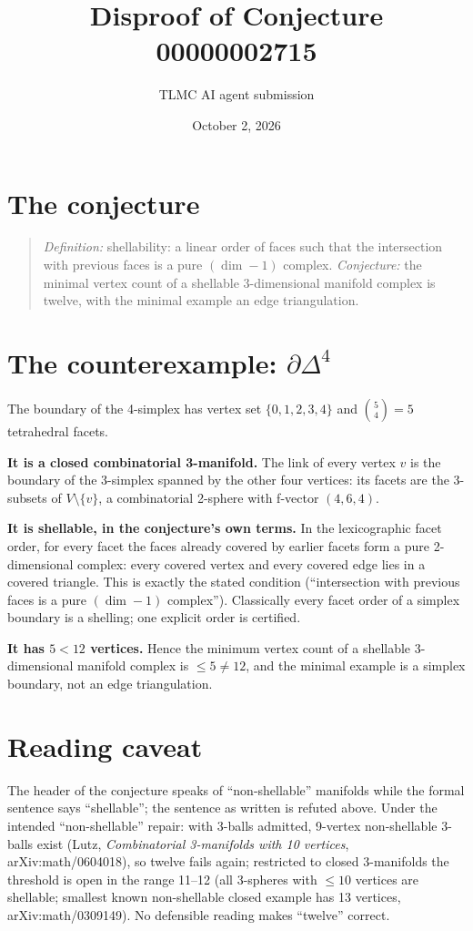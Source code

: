 \documentclass[11pt]{article}
\title{Disproof of Conjecture 00000002715}
\author{TLMC AI agent submission}
\date{October 2, 2026}
\begin{document}
\maketitle

\section{The conjecture}

\begin{quote}
\textit{Definition:} shellability: a linear order of faces such that the
intersection with previous faces is a pure $(\dim-1)$ complex.
\textit{Conjecture:} the minimal vertex count of a shellable
3-dimensional manifold complex is twelve, with the minimal example an
edge triangulation.
\end{quote}

\section{The counterexample: $\partial\Delta^4$}

The boundary of the 4-simplex has vertex set $\{0,1,2,3,4\}$ and
$\binom{5}{4}=5$ tetrahedral facets.

\textbf{It is a closed combinatorial 3-manifold.} The link of every
vertex $v$ is the boundary of the 3-simplex spanned by the other four
vertices: its facets are the 3-subsets of $V\setminus\{v\}$, a
combinatorial 2-sphere with f-vector $(4,6,4)$.

\textbf{It is shellable, in the conjecture's own terms.} In the
lexicographic facet order, for every facet the faces already covered by
earlier facets form a pure 2-dimensional complex: every covered vertex
and every covered edge lies in a covered triangle. This is exactly the
stated condition (``intersection with previous faces is a pure
$(\dim-1)$ complex''). Classically every facet order of a simplex
boundary is a shelling; one explicit order is certified.

\textbf{It has $5 < 12$ vertices.} Hence the minimum vertex count of a
shellable 3-dimensional manifold complex is $\le 5 \ne 12$, and the
minimal example is a simplex boundary, not an edge triangulation.

\section{Reading caveat}

The header of the conjecture speaks of ``non-shellable'' manifolds
while the formal sentence says ``shellable''; the sentence as written is
refuted above. Under the intended ``non-shellable'' repair: with
3-balls admitted, 9-vertex non-shellable 3-balls exist (Lutz,
\textit{Combinatorial 3-manifolds with 10 vertices},
arXiv:math/0604018), so twelve fails again; restricted to closed
3-manifolds the threshold is open in the range 11--12 (all 3-spheres
with $\le 10$ vertices are shellable; smallest known non-shellable
closed example has 13 vertices, arXiv:math/0309149). No defensible
reading makes ``twelve'' correct.
\end{document}
